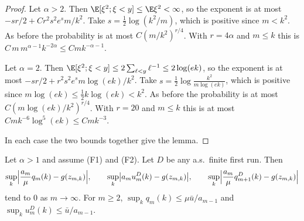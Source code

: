 \begin{proof}
Let $\alpha>2$. Then $\E[\xi^2;\xi<y]\le\E\xi^2<\infty$, so the exponent is at most
$-sr/2+Cr^2s^2e^sm/k^2$. Take $s=\frac12\log(k^2/m)$, which is positive since $m<k^2$.
As before the probability is at most $C(m/k^2)^{r/4}$. With $r=4\alpha$ and $m\le k$
this is $C\,m\,m^{\alpha-1}k^{-2\alpha}\le Cmk^{-\alpha-1}$.

Let $\alpha=2$. Then $\E[\xi^2;\xi<y]\le2\sum_{\ell<y}\ell^{-1}\le2\log(ek)$, so the
exponent is at most $-sr/2+r^2s^2e^sm\log(ek)/k^2$. Take
$s=\frac12\log\frac{k^2}{m\log(ek)}$, which is positive since
$m\log(ek)\le\frac12k\log(ek)<k^2$. As before the probability is at most
$C(m\log(ek)/k^2)^{r/4}$. With $r=20$ and $m\le k$ this is at most
$Cmk^{-6}\log^5(ek)\le Cmk^{-3}$.

In each case the two bounds together give the lemma.
\end{proof}

\begin{lemma}\label{lem:C-firstpassage}
Let $\alpha>1$ and assume \textup{(F1)} and \textup{(F2)}. Let $D$ be any a.s.\ finite
first run. Then
\[
\sup_k\Bigl\lvert\frac{a_m}\mu q_m(k)-g(z_{m,k})\Bigr\rvert,\qquad
\sup_k\bigl\lvert a_mu^D_m(k)-g(z_{m,k})\bigr\rvert,\qquad
\sup_k\Bigl\lvert\frac{a_m}\mu q^D_{m+1}(k)-g(z_{m,k})\Bigr\rvert
\]
tend to $0$ as $m\to\infty$. For $m\ge2$, $\sup_kq_m(k)\le\mu \bar u/a_{m-1}$ and
$\sup_ku^D_m(k)\le \bar u/a_{m-1}$.
\end{lemma}

